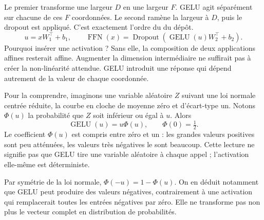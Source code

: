 Le premier  transforme une largeur $D$ en une largeur $F$. GELU agit séparément sur chacune de ces $F$ coordonnées. Le second  ramène la largeur à $D$, puis le dropout est appliqué. C'est exactement l'ordre du  du dépôt.
\[
 u=xW_1^\top+b_1,\qquad
 \operatorname{FFN}(x)=
 \operatorname{Dropout}\!\left(\operatorname{GELU}(u)W_2^\top+b_2\right).
\]
Pourquoi insérer une activation ? Sans elle, la composition de deux applications affines resterait affine. Augmenter la dimension intermédiaire ne suffirait pas à créer la non-linéarité attendue. GELU introduit une réponse qui dépend autrement de la valeur de chaque coordonnée.

Pour la comprendre, imaginons une variable aléatoire $Z$ suivant une loi normale centrée réduite, la courbe en cloche de moyenne zéro et d'écart-type un. Notons $\Phi(u)$ la probabilité que $Z$ soit inférieur ou égal à $u$. Alors
\[
 \operatorname{GELU}(u)=u\Phi(u),\qquad \Phi(0)=\tfrac12.
\]
Le coefficient $\Phi(u)$ est compris entre zéro et un : les grandes valeurs positives sont peu atténuées, les valeurs très négatives le sont beaucoup. Cette lecture ne signifie pas que GELU tire une variable aléatoire à chaque appel ; l'activation elle-même est déterministe.

Par symétrie de la loi normale, $\Phi(-u)=1-\Phi(u)$. On en déduit notamment que GELU peut produire des valeurs négatives, contrairement à une activation qui remplacerait toutes les entrées négatives par zéro. Elle ne transforme pas non plus le vecteur complet en distribution de probabilités.





